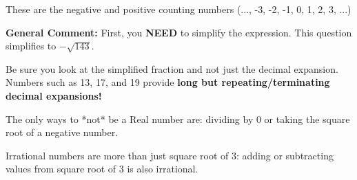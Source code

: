 \documentclass{extbook}[14pt]
\begin{document}
\begin{enumerate}
{\begin{enumerate}[label=\Alph*.]
These are the negative and positive counting numbers (..., -3, -2, -1, 0, 1, 2, 3, ...)
\end{enumerate}

\textbf{General Comment:} First, you \textbf{NEED} to simplify the expression. This question simplifies to $-\sqrt{143}$. 
 
 Be sure you look at the simplified fraction and not just the decimal expansion. Numbers such as 13, 17, and 19 provide \textbf{long but repeating/terminating decimal expansions!} 
 
 The only ways to *not* be a Real number are: dividing by 0 or taking the square root of a negative number. 
 
 Irrational numbers are more than just square root of 3: adding or subtracting values from square root of 3 is also irrational.
}
\end{enumerate}
\end{document}
